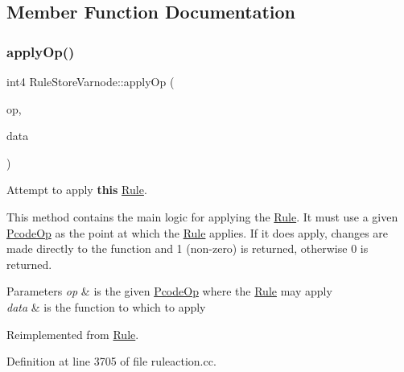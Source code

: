 \subsection{Member Function Documentation}
\mbox{\label{class_rule_store_varnode_af2356cc3335eab5bc75ff0d8f5223165}} 
\subsubsection{\texorpdfstring{applyOp()}{applyOp()}}
{\footnotesize\ttfamily int4 Rule\+Store\+Varnode\+::apply\+Op (\begin{DoxyParamCaption}\item[{\mbox{\hyperlink{class_pcode_op}{Pcode\+Op}} $\ast$}]{op,  }\item[{\mbox{\hyperlink{class_funcdata}{Funcdata}} \&}]{data }\end{DoxyParamCaption})\hspace{0.3cm}{\ttfamily [virtual]}}



Attempt to apply {\bfseries{this}} \mbox{\hyperlink{class_rule}{Rule}}. 

This method contains the main logic for applying the \mbox{\hyperlink{class_rule}{Rule}}. It must use a given \mbox{\hyperlink{class_pcode_op}{Pcode\+Op}} as the point at which the \mbox{\hyperlink{class_rule}{Rule}} applies. If it does apply, changes are made directly to the function and 1 (non-\/zero) is returned, otherwise 0 is returned. 
\begin{DoxyParams}{Parameters}
{\em op} & is the given \mbox{\hyperlink{class_pcode_op}{Pcode\+Op}} where the \mbox{\hyperlink{class_rule}{Rule}} may apply \\
\hline
{\em data} & is the function to which to apply \\
\hline
\end{DoxyParams}


Reimplemented from \mbox{\hyperlink{class_rule_a4e3e61f066670175009f60fb9dc60848}{Rule}}.



Definition at line 3705 of file ruleaction.\+cc.

